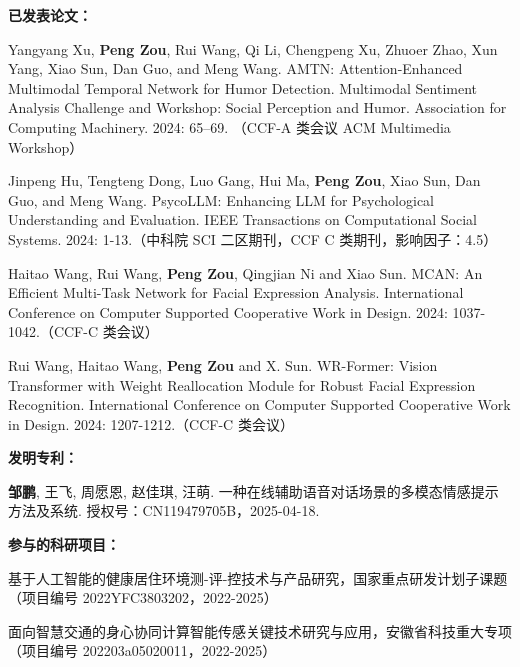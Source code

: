 
\begin{achievements}

\textbf{已发表论文：}
\begin{enumerate}[label=\text{[\arabic*]}] %
  \item Yangyang Xu, \textbf{Peng Zou}, Rui Wang, Qi Li, Chengpeng Xu, Zhuoer Zhao, Xun Yang, Xiao Sun, Dan Guo, and Meng Wang. AMTN: Attention-Enhanced Multimodal Temporal Network for Humor Detection. Multimodal Sentiment Analysis Challenge and Workshop: Social Perception and Humor. Association for Computing Machinery. 2024: 65–69. （CCF-A 类会议 ACM Multimedia Workshop）

  \item Jinpeng Hu, Tengteng Dong, Luo Gang, Hui Ma, \textbf{Peng Zou}, Xiao Sun, Dan Guo, and Meng Wang. PsycoLLM: Enhancing LLM for Psychological Understanding and Evaluation. IEEE Transactions on Computational Social Systems. 2024: 1-13.（中科院 SCI 二区期刊，CCF C 类期刊，影响因子：4.5）

  \item Haitao Wang, Rui Wang, \textbf{Peng Zou}, Qingjian Ni and Xiao Sun. MCAN: An Efficient Multi-Task Network for Facial Expression Analysis. International Conference on Computer Supported Cooperative Work in Design. 2024: 1037-1042.（CCF-C 类会议）

  \item Rui Wang, Haitao Wang, \textbf{Peng Zou} and X. Sun. WR-Former: Vision Transformer with Weight Reallocation Module for Robust Facial Expression Recognition. International Conference on Computer Supported Cooperative Work in Design. 2024: 1207-1212.（CCF-C 类会议）
\end{enumerate}

\textbf{发明专利：}
\begin{enumerate}[label=\text{[\arabic*]}] %
  \item \textbf{邹鹏}, 王飞, 周愿恩, 赵佳琪, 汪萌. 一种在线辅助语音对话场景的多模态情感提示方法及系统. 授权号：CN119479705B，2025-04-18.
\end{enumerate}

\textbf{参与的科研项目：}
\begin{enumerate}[label=\text{[\arabic*]}] %
  \item 基于人工智能的健康居住环境测-评-控技术与产品研究，国家重点研发计划子课题（项目编号 2022YFC3803202，2022-2025）
  \item 面向智慧交通的身心协同计算智能传感关键技术研究与应用，安徽省科技重大专项（项目编号 202203a05020011，2022-2025）
\end{enumerate}

\end{achievements}
